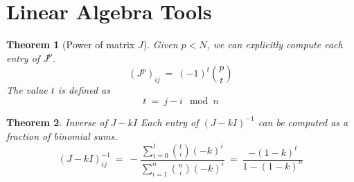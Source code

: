 \documentclass{article}
\newtheorem{theorem}{Theorem}
\begin{document}
\section{Linear Algebra Tools}
\begin{theorem}[Power of matrix $J$]
    Given $p < N $, we can explicitly compute each entry of $J^p$. 
    \[
    (J^p)_{ij} \ = \ (-1)^t \binom p t 
    \]
    The value $t$ is defined as 
        \[
        t \ = \ j - i \mod n
    \]
\end{theorem}

\begin{theorem}{Inverse of $J - kI$}
    Each entry of $(J - kI)^{-1}$ can be computed as a fraction 
    of binomial sums. 
    \[
    (J - kI)^{-1}_{ij} \ = \ 
    -\frac{
        \sum_{i = 0}^{t} \binom{t}{i}(-k)^i
    }{
        \sum_{i = 1}^{n} \binom{n}{i}(-k)^i
    } \ = \
    \frac {-(1 - k)^t} {1 - (1 - k)^n }
    \] 
\end{theorem}
\end{document}
